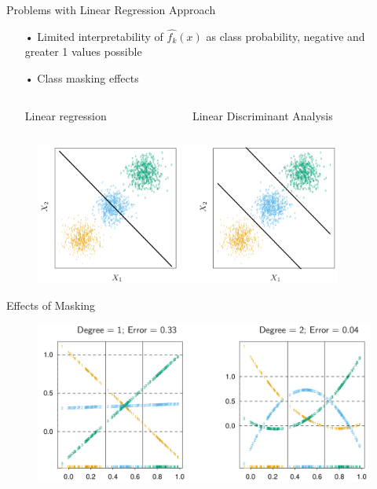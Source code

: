 \documentclass{beamer}
\begin{document}
\begin{frame}{Problems with Linear Regression Approach}
\begin{itemize}
\item[•] Limited interpretability of $\hat{f_k}(x)$ as class probability, negative and greater 1 values possible
\pause
\item[•] Class masking effects

\vspace{0.8cm}


\begin{columns}
\begin{column}{0.5\textwidth}
\begin{center}
Linear regression
\end{center}
\end{column}
\begin{column}{0.5\textwidth}
\begin{center}
Linear Discriminant Analysis
\end{center}
\end{column}
\end{columns}
\end{itemize}
\begin{figure}
\begin{flushleft}
\includegraphics[width=0.9\textwidth]{Masking1.png}
\end{flushleft}
\end{figure}
\end{frame}

\begin{frame}{Effects of Masking}
\begin{figure}
\centering
\includegraphics[width=\textwidth]{Masking2.png}
\end{figure}
\end{frame}
\end{document}

